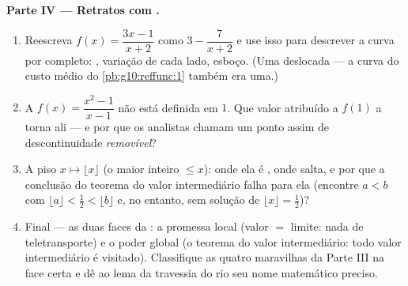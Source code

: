 \begin{problem}
\medskip
\noindent\textbf{Parte IV --- Retratos com .}
\begin{enumerate}[resume]
  \item Reescreva $f(x) = \dfrac{3x - 1}{x + 2}$ como
        $3 - \dfrac{7}{x + 2}$ e use isso para descrever a curva
        por completo: , variação de cada lado, esboço.
        (Uma  deslocada --- a curva do custo médio do
        \cref{pb:g10:reffunc:1} também era uma.)
  \item A  $f(x) = \dfrac{x^2 - 1}{x - 1}$ não está
        definida em $1$. Que valor atribuído a $f(1)$ a torna
         ali --- e por que os analistas chamam um ponto
        assim de descontinuidade \emph{removível}?
  \item A  piso $x \mapsto \lfloor x \rfloor$ (o maior
        inteiro $\leq x$): onde ela é , onde salta, e por
        que a conclusão do teorema do valor intermediário falha
        para ela (encontre $a < b$ com
        $\lfloor a \rfloor < \frac12 < \lfloor b \rfloor$ e, no
        entanto, sem solução de
        $\lfloor x \rfloor = \frac12$)?
  \item Final --- as duas faces da : a promessa local
        (valor $=$ limite: nada de teletransporte) e o poder
        global (o teorema do valor intermediário: todo valor
        intermediário é visitado). Classifique as quatro
        maravilhas da Parte III na face certa e dê ao lema da
        travessia do rio seu nome matemático preciso.
\end{enumerate}
\end{problem}
